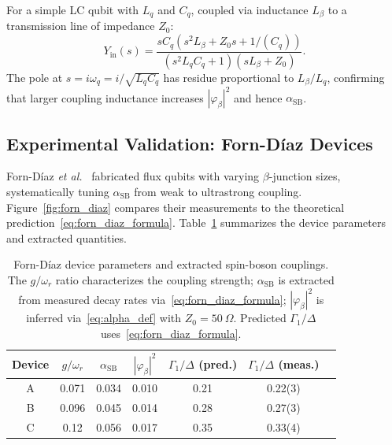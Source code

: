 \documentclass[reprint, floatfix, superscriptaddress, amsmath, amssymb, longbibliography]{revtex4-2}
\begin{document}
For a simple LC qubit with $L_q$ and $C_q$, coupled via inductance $L_\beta$ to a transmission line of impedance $Z_0$:
\begin{equation}
Y_{\mathrm{in}}(s) = \frac{s C_q (s^2 L_\beta + Z_0 s + 1/(C_q))}{(s^2 L_q C_q + 1)(s L_\beta + Z_0)}.
\label{eq:admittance_example}
\end{equation}
The pole at $s = i\omega_q = i/\sqrt{L_q C_q}$ has residue proportional to $L_\beta/L_q$, confirming that larger coupling inductance increases $|\varphi_\beta|^2$ and hence $\alpha_{\mathrm{SB}}$.




\subsection{Experimental Validation: Forn-D\'iaz Devices}
\label{sec:forn_diaz}

Forn-D\'iaz \textit{et al.}~\cite{FornDiaz2017} fabricated flux qubits with varying $\beta$-junction sizes, systematically tuning $\alpha_{\mathrm{SB}}$ from weak to ultrastrong coupling. Figure~\ref{fig:forn_diaz} compares their measurements to the theoretical prediction~\eqref{eq:forn_diaz_formula}. Table~\ref{tab:forn_diaz} summarizes the device parameters and extracted quantities.

\begin{table}[t]
\centering
\caption{Forn-D\'iaz device parameters and extracted spin-boson couplings. The $g/\omega_r$ ratio characterizes the coupling strength; $\alpha_{\mathrm{SB}}$ is extracted from measured decay rates via~\eqref{eq:forn_diaz_formula}; $|\varphi_\beta|^2$ is inferred via~\eqref{eq:alpha_def} with $Z_0 = 50~\Omega$. Predicted $\Gamma_1/\Delta$ uses~\eqref{eq:forn_diaz_formula}.}
\label{tab:forn_diaz}
\begin{tabular}{ccccccc}
\hline\hline
Device & $g/\omega_r$ & $\alpha_{\mathrm{SB}}$ & $|\varphi_\beta|^2$ & $\Gamma_1/\Delta$ (pred.) & $\Gamma_1/\Delta$ (meas.) \\
\hline
A & 0.071 & 0.034 & 0.010 & 0.21 & 0.22(3) \\
B & 0.096 & 0.045 & 0.014 & 0.28 & 0.27(3) \\
C & 0.12 & 0.056 & 0.017 & 0.35 & 0.33(4) \\
\hline\hline
\end{tabular}
\end{table}
\end{document}
